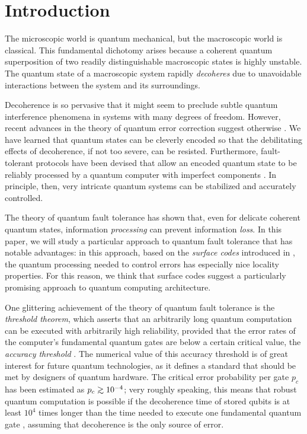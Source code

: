 \section{Introduction}
The microscopic world is quantum mechanical, but the macroscopic world is classical. This fundamental dichotomy arises because a coherent quantum superposition of two readily distinguishable macroscopic states is highly unstable. The quantum state of a macroscopic system rapidly {\em decoheres} due to unavoidable interactions between the system and its surroundings. 

Decoherence is so pervasive that it might seem to preclude subtle quantum interference phenomena in systems with many degrees of freedom. However, recent advances in the theory of quantum error correction suggest otherwise \cite{shor_9,steane_7}. We have learned that quantum states can be cleverly encoded so that the debilitating effects of decoherence, if not too severe, can be resisted. Furthermore, fault-tolerant protocols have been devised that allow an encoded quantum state to be reliably processed by a quantum computer with imperfect components \cite{shor_ft}. In principle, then, very intricate quantum systems can be stabilized and accurately controlled.

The theory of quantum fault tolerance has shown that, even for delicate coherent quantum states, information {\em processing} can prevent information {\em loss}. In this paper, we will study a particular approach to quantum fault tolerance that has notable advantages: in this approach, based on the {\em surface codes} introduced in \cite{kitaev1,kitaev2}, the quantum processing needed to control errors has especially nice locality properties. For this reason, we think that surface codes suggest a particularly promising approach to quantum computing architecture.

One glittering achievement of the theory of quantum fault tolerance is the {\em threshold theorem}, which asserts that an arbitrarily long quantum computation can be executed with arbitrarily high reliability, provided that the error rates of the computer's fundamental quantum gates are below a certain critical value, the {\em accuracy threshold} \cite{knill,ben-or,kitaev_threshold,jp_threshold,gottesman_threshold}. The numerical value of this accuracy threshold is of great interest for future quantum technologies, as it defines a standard that should be met by designers of quantum hardware. The critical error probability per gate $p_c$ has been estimated as $p_c\gsim 10^{-4}$; very roughly speaking, this means that robust quantum computation is possible if the decoherence time of stored qubits is at least $10^4$ times longer than the time needed to execute one fundamental quantum gate \cite{jp_gott}, assuming that decoherence is the only source of error.

